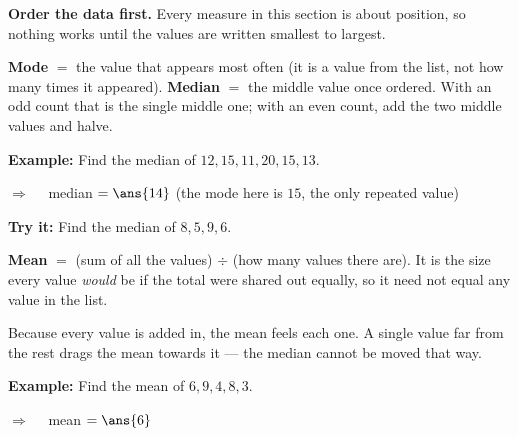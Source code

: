 \documentclass[12pt]{article}
\begin{document}


\begin{formulabox}
\textbf{Order the data first.} Every measure in this section is about position, so nothing
works until the values are written smallest to largest.\par
\smallskip
\textbf{Mode} $=$ the value that appears most often (it is a value from the list, not how many
times it appeared). \quad \textbf{Median} $=$ the middle value once ordered. With an odd count
that is the single middle one; with an even count, add the two middle values and halve.
\end{formulabox}

\begin{examplebox}
\textbf{Example:} \quad Find the median of $12, 15, 11, 20, 15, 13$.

$\Rightarrow\quad$ median $= \ans{14}$ \quad (the mode here is $15$, the only repeated value)
\end{examplebox}

\begin{tryitbox}
\textbf{Try it:} \quad Find the median of $8, 5, 9, 6$.\\[2pt]
\end{tryitbox}


\begin{formulabox}
\textbf{Mean} $=$ (sum of all the values) $\div$ (how many values there are). It is the size
every value \emph{would} be if the total were shared out equally, so it need not equal any
value in the list.\par
\smallskip
Because every value is added in, the mean feels each one. A single value far from the rest
drags the mean towards it --- the median cannot be moved that way.
\end{formulabox}

\begin{examplebox}
\textbf{Example:} \quad Find the mean of $6, 9, 4, 8, 3$.

$\Rightarrow\quad$ mean $= \ans{6}$
\end{examplebox}
\end{document}
